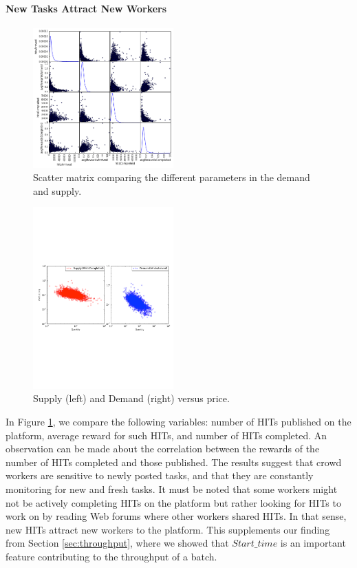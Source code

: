 \paragraph{New Tasks Attract New Workers}
\begin{figure}[tb]
	\centering
		\includegraphics[width=0.48\textwidth]{figures/scattermatrix}
	\caption{Scatter matrix comparing the different parameters in the demand and supply.}
	\label{fig:scatter_matrix}
\end{figure}
\begin{figure}[tb]
	\centering
		\includegraphics[width=0.48\textwidth]{figures/supply_demand}
	\caption{Supply (left) and Demand (right) versus price.}
	\label{fig:dsup}
\end{figure}
In Figure \ref{fig:scatter_matrix}, we compare the following variables: number of HITs published on the platform, average reward for such HITs, and number of HITs completed. An observation can be made about the correlation between the rewards of the number of HITs completed and those published.
The results suggest that crowd workers are sensitive to newly posted tasks, and that they are constantly monitoring for new and fresh tasks.
It must be noted that some workers might not be actively completing HITs on the platform but rather looking for HITs to work on by reading Web forums where other workers shared HITs. In that sense, new HITs attract new workers to the platform.
This supplements our finding from Section \ref{sec:throughput}, where we showed that $Start\_time$ is an important feature contributing to the throughput of a batch.

